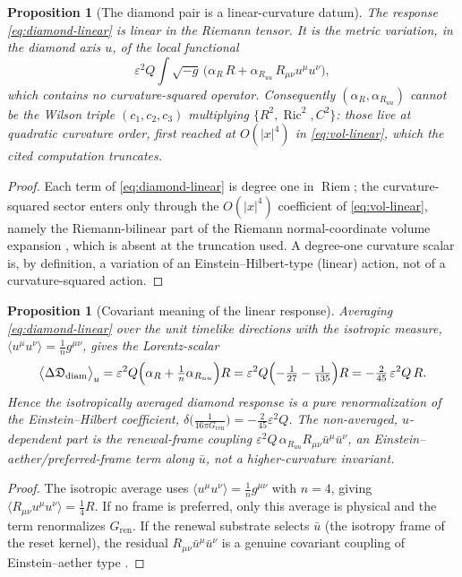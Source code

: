 \documentclass[11pt]{article}
\newtheorem{proposition}[theorem]{Proposition}
\theoremstyle{definition}
\theoremstyle{remark}
\newcommand{\eps}{\varepsilon}
\newcommand{\Ric}{\operatorname{Ric}}
\newcommand{\Riem}{\operatorname{Riem}}
\newcommand{\Gren}{G_{\mathrm{ren}}}
\newcommand{\Weyl}{C}
\begin{document}
\begin{proposition}[The diamond pair is a linear-curvature datum]
\label{prop:diamond-linear-datum}
The response \eqref{eq:diamond-linear} is linear in the Riemann tensor.  It is the
metric variation, in the diamond axis $u$, of the local functional
\[
 \eps^2 Q\!\int\!\sqrt{-g}\,
 \bigl(\alpha_R\,R+\alpha_{R_{uu}}\,R_{\mu\nu}u^\mu u^\nu\bigr),
\]
which contains \emph{no} curvature-squared operator.  Consequently
$(\alpha_R,\alpha_{R_{uu}})$ cannot be the Wilson triple $(c_1,c_2,c_3)$
multiplying $\{R^2,\Ric^2,\Weyl^2\}$: those live at quadratic curvature order,
first reached at $O(|x|^4)$ in \eqref{eq:vol-linear}, which the cited computation
truncates.
\end{proposition}

\begin{proof}
Each term of \eqref{eq:diamond-linear} is degree one in $\Riem$; the
curvature-squared sector enters only through the $O(|x|^4)$ coefficient of
\eqref{eq:vol-linear}, namely the Riemann-bilinear part of the Riemann
normal-coordinate volume expansion \cite{GrayVanhecke,Brewin,Vassilevich}, which
is absent at the truncation used.  A degree-one curvature scalar is, by
definition, a variation of an Einstein--Hilbert-type (linear) action, not of a
curvature-squared action.
\end{proof}

\begin{proposition}[Covariant meaning of the linear response]
\label{prop:diamond-covariant-linear}
Averaging \eqref{eq:diamond-linear} over the unit timelike directions with the
isotropic measure, $\langle u^\mu u^\nu\rangle=\tfrac1n g^{\mu\nu}$, gives the
Lorentz-scalar
\[
 \bigl\langle\Delta\mathfrak D_{\mathrm{diam}}\bigr\rangle_u
 =\eps^2 Q\Bigl(\alpha_R+\tfrac1n\alpha_{R_{uu}}\Bigr)R
 =\eps^2 Q\Bigl(-\tfrac1{27}-\tfrac1{135}\Bigr)R
 =-\tfrac{2}{45}\,\eps^2 Q\,R .
\]
Hence the isotropically averaged diamond response is a pure renormalization of the
Einstein--Hilbert coefficient, $\delta\!\bigl(\tfrac1{16\pi\Gren}\bigr)=
-\tfrac{2}{45}\eps^2 Q$.  The non-averaged, $u$-dependent part is the
renewal-frame coupling $\eps^2 Q\,\alpha_{R_{uu}}R_{\mu\nu}\bar u^\mu\bar u^\nu$,
an Einstein--aether/preferred-frame term along $\bar u$, not a higher-curvature
invariant.
\end{proposition}
\begin{proof}
The isotropic average uses $\langle u^\mu u^\nu\rangle=\tfrac1n g^{\mu\nu}$ with
$n=4$, giving $\langle R_{\mu\nu}u^\mu u^\nu\rangle=\tfrac14R$.  If no frame is
preferred, only this average is physical and the term renormalizes $\Gren$.  If
the renewal substrate selects $\bar u$ (the isotropy frame of the reset kernel),
the residual $R_{\mu\nu}\bar u^\mu\bar u^\nu$ is a genuine covariant coupling of
Einstein--aether type \cite{JacobsonMattingly,Jacobson2008aether}.
\end{proof}
\end{document}
